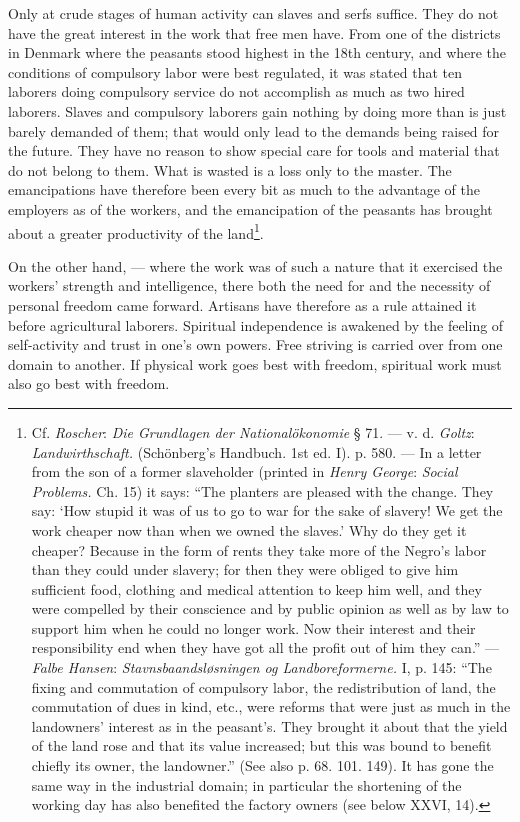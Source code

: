 \documentclass[12pt,a4paper,openany]{book}
\newcommand{\opage}[1]{\marginnote{\footnotesize\textit{[#1]}}}
\begin{document}
Only at crude stages of human activity can slaves and serfs suffice. They do not have the great interest in the work
that free men have. From one of the districts in Denmark where the peasants stood highest in the 18th century, and where
the conditions of compulsory labor were best regulated, it was stated that ten laborers doing compulsory service do not
accomplish as much as two hired laborers. Slaves and compulsory laborers gain nothing by doing more than is just barely
demanded of them; that would only lead to the demands being raised for the future. They have no reason to show special
care for tools and material that do not belong to them. What is wasted is a loss only to the master. The emancipations
have therefore been every bit as much to the advantage of the employers as of the workers, and the emancipation of the
peasants has brought about a greater productivity of the land\footnote[1]{Cf. \emph{Roscher}: \textit{Die Grundlagen der
Nationalökonomie} § 71. --- v. d. \emph{Goltz}: \textit{Landwirthschaft.} (Schönberg's Handbuch. 1st ed. I). p. 580. ---
In a letter from the son of a former slaveholder (printed in \emph{Henry George}: \textit{Social Problems.} Ch. 15) it
says: ``The planters are pleased with the change. They say: `How stupid it was of us to go to war for the sake of
slavery! We get the work cheaper now than when we owned the slaves.' Why do they get it cheaper? Because in the form of
rents they take more of the Negro's labor than they could under slavery; for then they were obliged to give him
sufficient food, clothing and medical attention to keep him well, and they were compelled by their conscience and by
public opinion as well as by law to support him when he could no longer work. Now their interest and their responsibility
end when they have got all the profit out of him they can.''%
--- \emph{Falbe Hansen}: \textit{Stavnsbaandsløsningen og Landboreformerne.} I, p. 145: ``The fixing and commutation of
compulsory labor, the redistribution of land, the commutation of dues in kind, etc., were reforms that were just as much
in the landowners' interest as in the peasant's. They brought it about that the yield of the land rose and that its value
increased; but this was bound to benefit chiefly its owner, the landowner.'' (See also p. 68. 101. 149). It has gone the
same way in the industrial domain; in particular the shortening of the working day has also benefited the factory owners
(see below XXVI, 14).}.

\opage{350}On the other hand, --- where the work was of such a nature that it exercised the workers' strength and
intelligence, there both the need for and the necessity of personal freedom came forward. Artisans have therefore as a
rule attained it before agricultural laborers. Spiritual independence is awakened by the feeling of self-activity and
trust in one's own powers. Free striving is carried over from one domain to another. If physical work goes best with
freedom, spiritual work must also go best with freedom.
\end{document}
